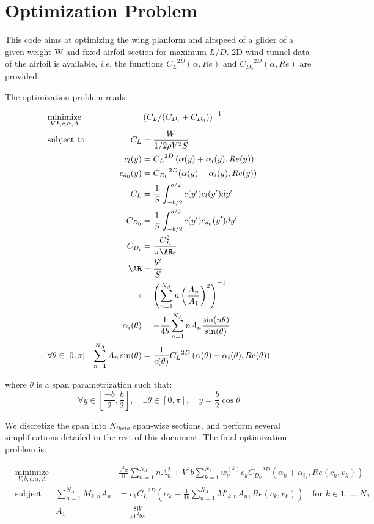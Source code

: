 \documentclass[letterpaper,12pt]{article}
\begin{document}
\section{Optimization Problem}

This code aims at optimizing the wing planform and airspeed of a glider of a given weight W and fixed airfoil section for maximum $L/D$.
2D wind tunnel data of the airfoil is available, {\it i.e.} the functions
${C_L}^{2D}(\alpha, Re)$ and 
${C_{D_0}}^{2D}(\alpha, Re)$ are provided.

The optimization problem reads:

\begin{align*}
	& \underset{V, b, c, \alpha, A}{\text{minimize}}
	& & \left( C_L / (C_{D_i} + C_{D_0})\right)^{-1} \nonumber \\
	& \text{subject to} 
	& C_L &= \frac{W}{1/2 \rho V^2 S} \\
	& & c_l(y) &= {C_L}^{2D} \left( \alpha(y) + \alpha_i(y), Re(y)\right) \\
	& & c_{d_0}(y) &= {C_{D_0}}^{2D}(\alpha(y) - \alpha_i(y), Re(y)) \\
	& & C_L &= \frac 1 S \int_{-b/2}^{b/2} c(y') c_l(y') dy'\\
	& & C_{D_0} &= \frac 1 S \int_{-b/2}^{b/2} c(y') c_{d_0}(y') dy'\\
	& & C_{D_i} & = \frac{C_L^2}{\pi \AR \epsilon} \\
	& & \AR &= \frac{b^2}{S} \\
	& & \epsilon &= \left(\sum_{n=1}^{N_A} n \left(\frac{A_n}{A_1}\right)^2 \right)^{-1} \\
	& & \alpha_i(\theta) &= -\frac 1 {4b} \sum_{n=1}^{N_A} n A_n\frac{\sin(n\theta)}{\sin(\theta)} \\
	& \forall \theta \in [0, \pi] & \sum_{n=1}^{N_A} A_n \sin(\theta) &= \frac{1}{
		c(\theta)} {C_L}^{2D} \left( 
			\alpha(\theta) - \alpha_i(\theta), Re(\theta)
		\right) \\
\end{align*}

where $\theta$ is a span parametrization such that:
$$\forall y \in [\frac {-b} 2, \frac b 2], \quad \exists \theta \in [0,\pi], \quad y = \frac b 2 \cos\theta$$

We discretize the span into $N_{theta}$ span-wise sections, and perform several simplifications detailed in the rest of this document.
The final optimization problem is:

\begin{align*}
	& \underset{V, b, c, \alpha, A}{\text{minimize}}
	& & \frac{V^2 \pi}{8}\sum_{n=1}^{N_A} n A_{n}^2 +
	  V^2 b  \sum_{k=1}^{N_{\theta}} w_{\theta}^{(k)} c_k {C_{D_0}}^{2D}\left( 
		\alpha_k +\alpha_{i_k}, Re(c_k, v_k)
		\right) \\
	& \text{subject to}
	&  \sum_{n=1}^{N_{A}} M_{k,n} A_n &=  c_k{C_L}^{2D} \left( \alpha_k - \frac {1}{4b} 
		\sum_{n=1}^{N_{A}}M'_{k,n}A_n , Re(c_k, v_k)\right) \quad \text{for } k \in 1,\dots, N_{\theta} \\
	& &  A_1 &= \frac{8W}{\rho V^2 b \pi}\\
\end{align*}
\end{document}
